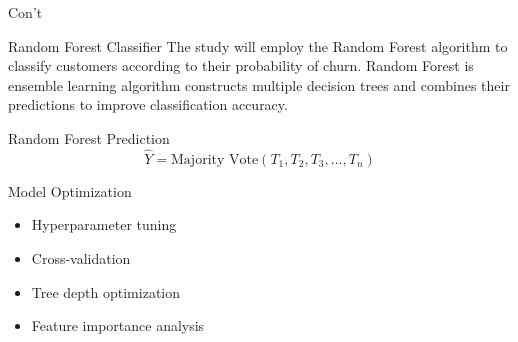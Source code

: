 \documentclass[10pt]{beamer}
\begin{document}
\begin{frame}{Con't}
	
	\small
	
	\begin{block}{Random Forest Classifier}
		The study will employ the Random Forest algorithm to classify customers according to their probability of churn. Random Forest is ensemble learning algorithm constructs multiple decision trees and combines their predictions to improve classification accuracy.
	\end{block}
	
	\vspace{0.2cm}
	
	\begin{exampleblock}{Random Forest Prediction}
		\[
		\hat{Y} = \text{Majority Vote}(T_1,T_2,T_3,\dots,T_n)
		\]
	\end{exampleblock}
	
	\vspace{0.2cm}

		
		\begin{exampleblock}{Model Optimization}
			\begin{itemize}
				\item Hyperparameter tuning
				
				\item Cross-validation
				
				\item Tree depth optimization
				
				\item Feature importance analysis
			\end{itemize}
		\end{exampleblock}
		

	
\end{frame}
\end{document}
